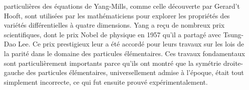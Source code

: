 particulières des équations de Yang-Mills, comme celle découverte par Gerard't Hooft, sont utilisées par les mathématiciens pour explorer les propriétés des variétés différentielles à quatre dimensions. Yang a reçu de nombreux prix scientifiques, dont le prix Nobel de physique en 1957 qu'il a partagé avec Tsung-Dao Lee. Ce prix prestigieux leur a été accordé pour leurs travaux sur les lois de la parité dans le domaine des particules élémentaires. Ces travaux fondamentaux sont particulièrement importants parce qu'ils ont montré que la symétrie droite-gauche des particules élémentaires, universellement admise à l'époque, était tout simplement incorrecte, ce qui fut ensuite prouvé expérimentalement.

